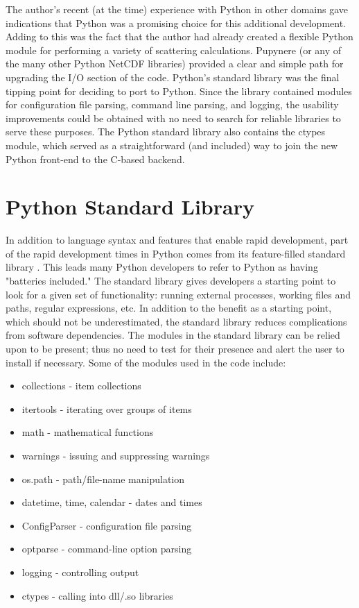 \documentclass[twocolumn]{article}
\begin{document}
The author's recent (at the time) experience with Python in other domains gave
indications that Python was a promising choice for this additional development.
Adding to this was the fact that the author had already created a flexible Python
module for performing a variety of scattering calculations. Pupynere (or any
of the many other Python NetCDF libraries) provided a clear and simple path
for upgrading the I/O section of the code. Python's standard
library was the final tipping point for deciding to port to Python. Since the
library contained modules for configuration file parsing, command line parsing,
and logging, the usability improvements could be obtained with no need to search
for reliable libraries to serve these purposes. The Python standard library also
contains the ctypes module, which served as a straightforward (and included) way
to join the new Python front-end to the C-based backend.


\section{Python Standard Library}
In addition to language syntax and features that enable rapid development, part
of the rapid development times in Python comes from its feature-filled standard
library \cite{pythonlib}. This leads many Python developers to refer to Python
as having "batteries included." The standard library gives developers a starting
point to look for a given set of functionality: running external processes,
working files and paths, regular expressions, etc. In addition to the benefit as
a starting point, which should not be underestimated, the standard library
reduces complications from software dependencies. The modules in the standard
library can be relied upon to be present; thus no need to test for their
presence and alert the user to install if necessary. Some of the modules used in
the code include:

\begin{itemize}
    \item collections - item collections
    \item itertools - iterating over groups of items
    \item math - mathematical functions
    \item warnings - issuing and suppressing warnings
    \item os.path - path/file-name manipulation
    \item datetime, time, calendar - dates and times
    \item ConfigParser - configuration file parsing
    \item optparse - command-line option parsing
    \item logging - controlling output
    \item ctypes - calling into dll/.so libraries
\end{itemize}
\end{document}
